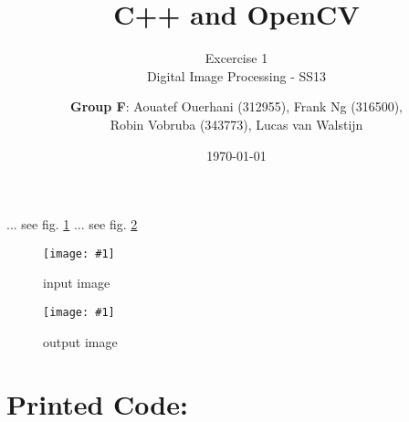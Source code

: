\documentclass[a4paper,headings=small]{scrartcl}
\title{C++ and OpenCV}
\subtitle{Excercise 1 \\ Digital Image Processing - SS13}
\author{\textbf{Group F}: Aouatef Ouerhani (312955), Frank Ng (316500),\\ Robin Vobruba (343773), Lucas van Walstijn}
\date{\today}
\numberwithin{equation}{section} %
\numberwithin{figure}{section}   %
\newcommand{\image}[3]{
	\begin{figure}[htbp]
		\centering
		\texttt{[image: \#1]}
		\caption{#3}
		\label{fig:#1}
	\end{figure}
}
\newcommand{\imgRoot}{../resources/img}
\newcommand{\imgGeneratedRoot}{../../../target}
\begin{document}
\maketitle

... see fig. \ref{fig:\imgRoot/input.jpg}
... see fig. \ref{fig:\imgGeneratedRoot/output.jpg}


\image{\imgRoot/input.jpg}{0.9}{%
		input image}

\image{\imgGeneratedRoot/output.jpg}{0.9}{%
		output image}


\newpage
\section{Printed Code:}


\end{document}

